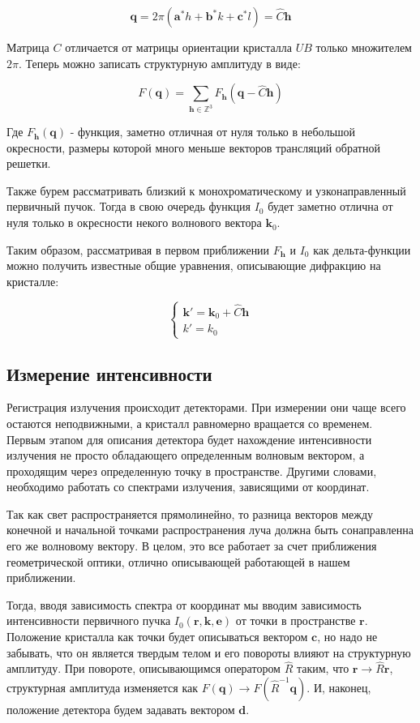 \documentclass[12pt]{article}
\begin{document}
\[\pmb{q} = 2 \pi (\pmb{a}^\ast h + \pmb{b}^\ast k +\pmb{c}^\ast l) = \hat{C}\pmb{h}\]

Матрица $C$ отличается от матрицы ориентации кристалла $UB$ только множителем $2 \pi$.
Теперь можно записать структурную амплитуду в виде:

\[F(\pmb{q}) = \sum_{\pmb{h} \in \mathbb{Z}^3} F_{\pmb{h}}(\pmb{q} - \hat{C} \pmb{h})\]

Где $F_{\pmb{h}}(\pmb{q})$ - функция, заметно отличная от нуля только в небольшой окресности,
размеры которой много меньше векторов трансляций обратной решетки.

Также бурем рассматривать близкий к монохроматическому и узконаправленный
первичный пучок. Тогда в свою очередь функция $I_0$ будет заметно
отлична от нуля только в окресности некого волнового вектора $\pmb{k}_0$.

Таким образом, рассматривая в первом приближении $F_{\pmb{h}}$ и $I_0$ как
дельта-функции можно получить известные общие уравнения, описывающие дифракцию на кристалле:

\[\begin{cases}
\pmb{k'} = \pmb{k}_0 + \hat{C}\pmb{h} \\
k' = k_0
\end{cases}\]

\subsection*{Измерение интенсивности}

Регистрация излучения происходит детекторами. При измерении они чаще всего остаются
неподвижными, а кристалл равномерно вращается со временем. Первым этапом
для описания детектора будет нахождение интенсивности излучения не просто
обладающего определенным волновым вектором, а проходящим через определенную
точку в пространстве. Другими словами, необходимо работать со спектрами
излучения, зависящими от координат.

Так как свет распространяется прямолинейно, то разница векторов между
конечной и начальной точками распространения луча должна быть сонаправленна
его же волновому вектору. В целом, это все работает за счет приближения
геометрической оптики, отлично описывающей работающей в нашем приближении.

Тогда, вводя зависимость спектра от координат мы вводим зависимость
интенсивности первичного пучка $I_0(\pmb{r}, \pmb{k}, \pmb{e})$ от
точки в пространстве $\pmb{r}$. Положение кристалла как точки будет
описываться вектором $\pmb{c}$, но надо не забывать, что он является
твердым телом и его повороты влияют на структурную амплитуду.
При повороте, описывающимся оператором $\hat{R}$ таким, что
$\pmb{r} \rightarrow \hat{R} \pmb{r}$, структурная амплитуда изменяется как
$F(\pmb{q}) \rightarrow F(\hat{R}^{-1} \pmb{q})$. И, наконец, положение детектора
будем задавать вектором $\pmb{d}$.
\end{document}
